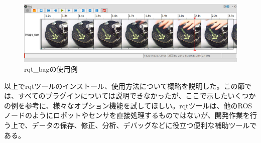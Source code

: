 \begin{figure}[h]
  \centering
  \includegraphics[width=\columnwidth]{pictures/chapter5/pic_05_13.png}
  \caption{rqt\_bagの使用例}
\end{figure}

以上でrqtツールのインストール、使用方法について概略を説明した。この節では、すべてのプラグインについては説明できなかったが、ここで示したいくつかの例を参考に、様々なオプション機能を試してほしい。rqtツールは、他のROSノードのようにロボットやセンサを直接処理するものではないが、開発作業を行う上で、データの保存、修正、分析、デバッグなどに役立つ便利な補助ツールである。

